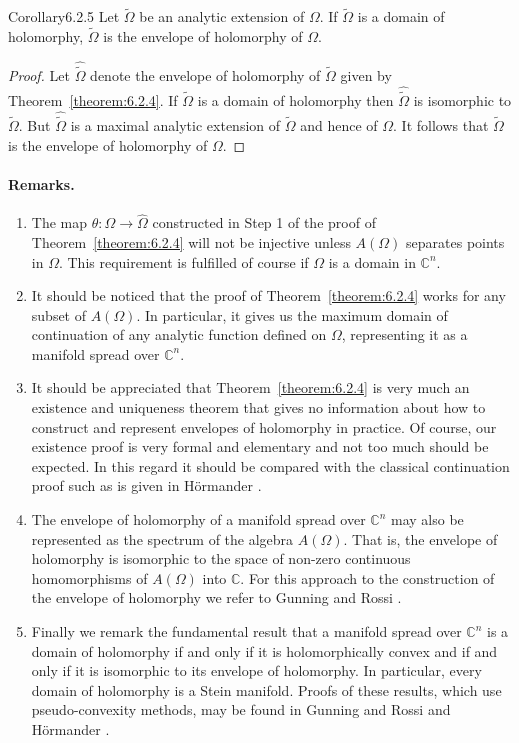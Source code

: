 \begin{originaltheorem}{Corollary}{6.2.5}
Let $\widetilde\Omega$ be an analytic extension of $\Omega$. If $\widetilde\Omega$ is a domain of holomorphy, $\widetilde\Omega$ is the envelope of holomorphy of $\Omega$.
\end{originaltheorem}
\begin{proof}
Let $\widehat{\widetilde\Omega}$ denote the envelope of holomorphy of $\widetilde\Omega$ given by Theorem~\ref{theorem:6.2.4}. If $\widetilde\Omega$ is a domain of holomorphy then $\widehat{\widetilde\Omega}$ is isomorphic to $\widetilde\Omega$. But $\widehat{\widetilde\Omega}$ is a maximal analytic extension of $\widetilde\Omega$ and hence of $\Omega$. It follows that $\widetilde\Omega$ is the envelope of holomorphy of $\Omega$.
\end{proof}
\paragraph{Remarks.}
\begin{enumerate}
\item The map $\theta:\Omega\to\widehat\Omega$ constructed in Step 1 of the proof of Theorem~\ref{theorem:6.2.4} will not be injective unless $A(\Omega)$ separates points in $\Omega$. This requirement is fulfilled of course if $\Omega$ is a domain in $\mathbb C^n$.
\item It should be noticed that the proof of Theorem~\ref{theorem:6.2.4} works for any subset of $A(\Omega)$. In particular, it gives us the maximum domain of continuation of any analytic function defined on $\Omega$, representing it as a manifold spread over $\mathbb C^n$.
\item It should be appreciated that Theorem~\ref{theorem:6.2.4} is very much an existence and uniqueness theorem that gives no information about how to construct and represent envelopes of holomorphy in practice. Of course, our existence proof is very formal and elementary and not too much should be expected. In this regard it should be compared with the classical continuation proof such as is given in H\"ormander \cite[Theorem 5.4.5]{bib:II:hormander-l:1}.
\item The envelope of holomorphy of a manifold spread over $\mathbb C^n$ may also be represented as the spectrum of the algebra $A(\Omega)$. That is, the envelope of holomorphy is isomorphic to the space of non-zero continuous homomorphisms of $A(\Omega)$ into $\mathbb C$. For this approach to the construction of the envelope of holomorphy we refer to Gunning and Rossi \cite{bib:II:gunning-r-c-and-rossi-h:1}.
\item Finally we remark the fundamental result that a manifold spread over $\mathbb C^n$ is a domain of holomorphy if and only if it is holomorphically convex and if and only if it is isomorphic to its envelope of holomorphy. In particular, every domain of holomorphy is a Stein manifold. Proofs of these results, which use pseudo-convexity methods, may be found in Gunning and Rossi \cite{bib:II:gunning-r-c-and-rossi-h:1} and H\"ormander \cite{bib:II:hormander-l:1}.
\end{enumerate}

